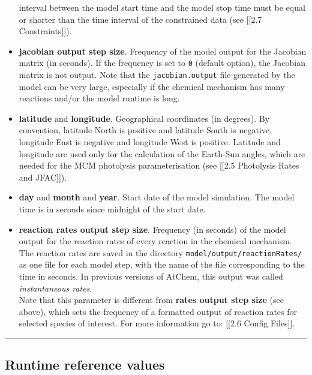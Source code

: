 \begin{itemize}
  interval between the model start time and the model stop time must be
  equal or shorter than the time interval of the constrained data (see
  {[}{[}2.7 Constraints{]}{]}).
\item
  \textbf{jacobian output step size}. Frequency of the model output for
  the Jacobian matrix (in seconds). If the frequency is set to
  \texttt{0} (default option), the Jacobian matrix is not output. Note
  that the \texttt{jacobian.output} file generated by the model can be
  very large, especially if the chemical mechanism has many reactions
  and/or the model runtime is long.
\item
  \textbf{latitude} and \textbf{longitude}. Geographical coordinates (in
  degrees). By convention, latitude North is positive and latitude South
  is negative, longitude East is negative and longitude West is
  positive. Latitude and longitude are used only for the calculation of
  the Earth-Sun angles, which are needed for the MCM photolysis
  parameterisation (see {[}{[}2.5 Photolysis Rates and JFAC{]}{]}).
\item
  \textbf{day} and \textbf{month} and \textbf{year}. Start date of the
  model simulation. The model time is in seconds since midnight of the
  start date.
\item
  \textbf{reaction rates output step size}. Frequency (in seconds) of
  the model output for the reaction rates of every reaction in the
  chemical mechanism. The reaction rates are saved in the directory
  \texttt{model/output/reactionRates/} as one file for each model step,
  with the name of the file corresponding to the time in seconds. In
  previous versions of AtChem, this output was called
  \emph{instantaneous rates}.\\
  Note that this parameter is different from \textbf{rates output step
  size} (see above), which sets the frequency of a formatted output of
  reaction rates for selected species of interest. For more information
  go to: {[}{[}2.6 Config Files{]}{]}.
\end{itemize}

\begin{center}\rule{0.5\linewidth}{\linethickness}\end{center}

\hypertarget{runtime-reference-values}{%
\subsection{Runtime reference values}\label{runtime-reference-values}}

